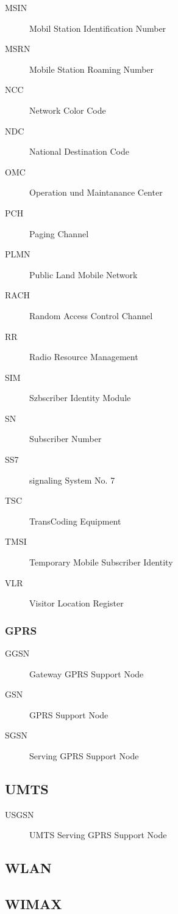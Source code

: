\begin{description}
	\item[MSIN] Mobil Station Identification Number
	\item[MSRN] Mobile Station Roaming Number
	\item[NCC] Network Color Code
	\item[NDC] National Destination Code
	\item[OMC] Operation und Maintanance Center
	\item[PCH] Paging Channel
	\item[PLMN] Public Land Mobile Network
	\item[RACH] Random Access Control Channel
	\item[RR] Radio Resource Management
	\item[SIM] Szbscriber Identity Module
	\item[SN] Subscriber Number
	\item[SS7] signaling System No. 7
	\item[TSC] TransCoding Equipment 
	\item[TMSI] Temporary Mobile Subscriber Identity
	\item[VLR] Visitor Location Register
\end{description}

\subsubsection{GPRS}

\begin{description}
	\item[GGSN] Gateway GPRS Support Node
	\item[GSN] GPRS Support Node
	\item[SGSN] Serving GPRS Support Node
\end{description}

\subsection{UMTS}

\begin{description}
	\item[USGSN] UMTS Serving GPRS Support Node
\end{description}

\subsection{WLAN}


\subsection{WIMAX}

